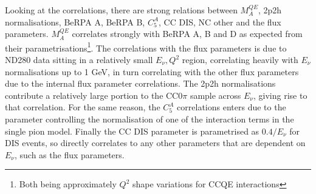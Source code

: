 Looking at the correlations, there are strong relations between $M_A^{QE}$, 2p2h normalisations, BeRPA A, BeRPA B, $C_5^A$, CC DIS, NC other and the flux parameters. $M_A^{QE}$ correlates strongly with BeRPA A, B and D as expected from their parametrisations\footnote{Both being approximately $Q^2$ shape variations for CCQE interactions}. The correlations with the flux parameters is due to ND280 data sitting in a relatively small $E_\nu, Q^2$ region, correlating heavily with $E_\nu$ normalisations up to 1 GeV, in turn correlating with the other flux parameters due to the internal flux parameter correlations. The 2p2h normalisations contribute a relatively large portion to the CC0$\pi$ sample across $E_\nu$, giving rise to that correlation. For the same reason, the $C_5^A$ correlations enters due to the parameter controlling the normalisation of one of the interaction terms in the single pion model. Finally the CC DIS parameter is parametrised as $0.4/E_\nu$ for DIS events, so directly correlates to any other parameters that are dependent on $E_\nu$, such as the flux parameters.
